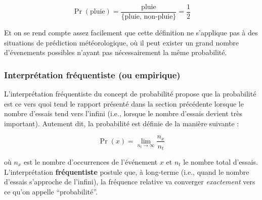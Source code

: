 \documentclass[
  a4paper,11pt,twoside,onecolumn,openright,final,oldfontcommands]{memoir}
\theoremstyle{definition}
\theoremstyle{definition}
\theoremstyle{definition}
\theoremstyle{remark}
\begin{document}
\[\Pr(\text{pluie}) = \frac{\text{pluie}}{ \{\text{pluie, non-pluie} \} } = \frac{1}{2}\]

Et on se rend compte assez facilement que cette définition ne s'applique pas à des situations de prédiction météorologique, où il peut exister un grand nombre d'évenements possibles n'ayant pas nécessairement la même probabilité.

\hypertarget{interpruxe9tation-fruxe9quentiste-ou-empirique}{%
\subsubsection{Interprétation fréquentiste (ou empirique)}\label{interpruxe9tation-fruxe9quentiste-ou-empirique}}

L'interprétation fréquentiste du concept de probabilité propose que la probabilité est ce vers quoi tend le rapport présenté dans la section précédente lorsque le nombre d'essais tend vers l'infini (i.e., lorsque le nombre d'essais devient très important). Autement dit, la probabilité est définie de la manière suivante :

\[\Pr(x) = \lim_{n_{t} \to \infty}\frac{n_{x}}{n_{t}}\]

où \(n_{x}\) est le nombre d'occurrences de l'événement \(x\) et \(n_{t}\) le nombre total d'essais. L'interprétation \textbf{fréquentiste} postule que, à long-terme (i.e., quand le nombre d'essais s'approche de l'infini), la fréquence relative va converger \emph{exactement} vers ce qu'on appelle ``probabilité''.
\end{document}
